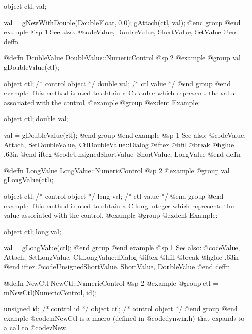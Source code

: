 object  ctl, val;

val = gNewWithDouble(DoubleFloat, 0.0);
gAttach(ctl, val);
@end group
@end example
@sp 1
See also:  @code{Value, DoubleValue, ShortValue, SetValue}
@end deffn












@deffn {DoubleValue} DoubleValue::NumericControl
@sp 2
@example
@group
val = gDoubleValue(ctl);

object  ctl;   /*  control object  */
double  val;   /*  ctl value       */
@end group
@end example
This method is used to obtain a C double which represents the
value associated with the control.  
@example
@group
@exdent Example:

object  ctl;
double  val;

val = gDoubleValue(ctl);
@end group
@end example
@sp 1
See also:  @code{Value, Attach, SetDoubleValue, CtlDoubleValue::Dialog}
@iftex
@hfil @break @hglue .63in 
@end iftex
@code{UnsignedShortValue, ShortValue, LongValue}
@end deffn











@deffn {LongValue} LongValue::NumericControl
@sp 2
@example
@group
val = gLongValue(ctl);

object  ctl;   /*  control object  */
long    val;   /*  ctl value       */
@end group
@end example
This method is used to obtain a C long integer which represents the
value associated with the control.  
@example
@group
@exdent Example:

object  ctl;
long    val;

val = gLongValue(ctl);
@end group
@end example
@sp 1
See also:  @code{Value, Attach, SetLongValue, CtlLongValue::Dialog}
@iftex
@hfil @break @hglue .63in 
@end iftex
@code{UnsignedShortValue, ShortValue, DoubleValue}
@end deffn








@deffn {NewCtl} NewCtl::NumericControl
@sp 2
@example
@group
ctl = mNewCtl(NumericControl, id);

unsigned  id;   /*  control id      */
object   ctl;   /*  control object  */
@end group
@end example
@code{mNewCtl} is a macro (defined in @code{dynwin.h}) that expands to
a call to @code{vNew}.

